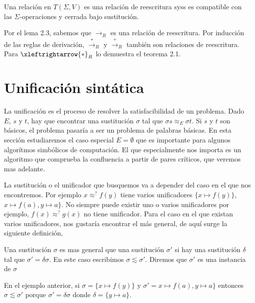 \begin{defi}
  Una relación en $T(\Sigma, V)$ es una relación de reescritura syss
  es compatible con las $\Sigma$-operaciones y cerrada bajo
  sustitución.
\end{defi}

Por el lema 2.3, sabemos que $\rightarrow_R$ es una relación de
reescritura. Por inducción de las reglas de derivación,
$\xrightarrow{*}_R$ y $\xrightarrow{+}_R$ también son relaciones de
reescritura. Para $\xleftrightarrow{*}_R$ lo demuestra el teorema 2.1.

\section{Unificación sintática}

La unificación es el proceso de resolver la satisfacibilidad de un
problema. Dado $E$, $s$ y $t$, hay que encontrar una sustitución
$\sigma$ tal que $\sigma s \approx _E \sigma t$. Si $s$ y $t$ son
básicos, el problema pasaría a ser un problema de palabras básicas. En
esta sección estudiaremos el caso especial $E = \emptyset$ que es
importante para algunos algorítmos simbólicos de computación. El que
especialmente nos importa es un algoritmo que comprueba la confluencia
a partir de pares críticos, que veremos mas adelante.

La sustitución o el unificador que busquemos va a
depender del caso en el que nos encontremos. Por ejemplo $x \approx^?
f(y)$ tiene varios unificadores $\{x \mapsto f(y) \}$, $x \mapsto
f(a), y \mapsto a\}$. No siempre puede existir uno o varios
unificadores por ejemplo, $f(x) \approx^? g(x)$ no tiene
unificador. Para el caso en el que existan varios unificadores, nos
gustaría encontrar el más general, de aquí surge la siguiente
definición,

\begin{defi}
  Una sustitución $\sigma$ es mas general que una sustitución
  $\sigma'$ si hay una sustitución $\delta$ tal que $ \sigma' = \delta
  \sigma$. En este caso escribimos $\sigma \lesssim \sigma'$. Diremos
  que $\sigma'$ es una instancia de $\sigma$
\end{defi}

En el ejemplo anterior, si $\sigma = \{x \mapsto f(y) \}$ y
$\sigma' = x \mapsto f(a), y \mapsto a\}$ entonces
$\sigma \lesssim \sigma'$ porque $\sigma' = \delta \sigma$ donde
$\delta = \{ y \mapsto a \}$.


